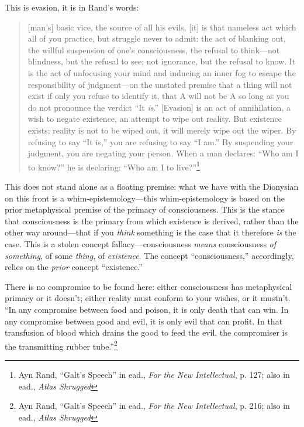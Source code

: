 \documentclass[11pt]{article}
\begin{document}
This is evasion, it is in Rand's words:
\begin{quote}
[man’s] basic vice, the source of all his evils, [it] is that nameless act which all of you practice, but struggle never to admit: the act of blanking out, the willful suspension of one’s consciousness, the refusal to think---not blindness, but the refusal to see; not ignorance, but the refusal to know. It is the act of unfocusing your mind and inducing an inner fog to escape the responsibility of judgment---on the unstated premise that a thing will not exist if only you refuse to identify it, that A will not be A so long as you do not pronounce the verdict ``It \emph{is}.'' [Evasion] is an act of annihilation, a wish to negate existence, an attempt to wipe out reality. But existence exists; reality is not to be wiped out, it will merely wipe out the wiper. By refusing to say ``It is,'' you are refusing to say ``I am.'' By suspending your judgment, you are negating your person. When a man declares: ``Who am I to know?'' he is declaring: ``Who am I to live?''\footnote{Ayn Rand, ``Galt's Speech'' in ead., \emph{For the New Intellectual}, p. 127; also in ead., \emph{Atlas Shrugged}}
\end{quote}

This does not stand alone as a floating premise: what we have with the Dionysian on this front is a whim-epistemology---this whim-epistemology is based on the prior metaphysical premise of the primacy of consciousness. This is the stance that consciousness is the primary from which existence is derived, rather than the other way around---that if you \emph{think} something is the case that it therefore \emph{is} the case. This is a stolen concept fallacy---consciousness \emph{means} consciousness \emph{of something}, of some \emph{thing}, of \emph{existence}. The concept ``consciousness,'' accordingly, relies on the \emph{prior} concept ``existence.''

There is no compromise to be found here: either consciousness has metaphysical primacy or it doesn't; either reality must conform to your wishes, or it mustn't. ``In any compromise between food and poison, it is only death that can win. In any compromise between good and evil, it is only evil that can profit. In that transfusion of blood which drains the good to feed the evil, the compromiser is the transmitting rubber tube.''\footnote{Ayn Rand, ``Galt's Speech'' in ead., \emph{For the New Intellectual}, p. 216; also in ead., \emph{Atlas Shrugged}}
\end{document}

